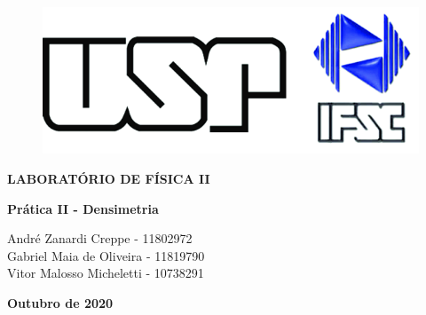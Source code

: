 \thispagestyle{empty}

\begin{figure}
  \centering
  \includegraphics[scale=0.4]{images/logo-usp-ifsc.png}
  \vspace*{-0.3cm}
\end{figure}

\begin{center}
{\large \rm \textbf {LABORATÓRIO DE FÍSICA II} \linebreak}
\end{center}

\baselineskip 30pt

\vspace*{0.3cm}

\begin{center}
{\LARGE \bfseries Prática II - Densimetria}
\end{center}

\vspace*{1cm}

\setcounter{footnote}{1}

\renewcommand{\thefootnote}{\fnsymbol{footnote}}
\begin{center}
{
    \sc  André Zanardi Creppe - 11802972 \\
    \sc  Gabriel Maia de Oliveira - 11819790 \\
    \sc  Vitor Malosso Micheletti - 10738291 \\
}
\vspace*{0.5cm}

\vspace*{-.5cm}
\end{center}


\baselineskip 17pt

\vspace*{1.5cm}
\begin{center}
{{\bf Outubro de 2020}}
\end{center}

\vspace*{.05cm}

\renewcommand{\thefootnote}{\arabic{footnote}}

\setcounter{footnote}{1}

\pagebreak

\baselineskip 19pt
